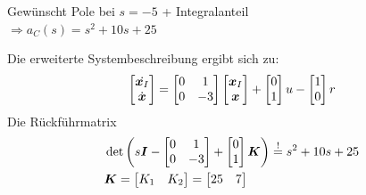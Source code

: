 \begin{tcolorbox}[colback=white!10!white,colframe=green!30!black,title=Integralregelung]
Gewünscht Pole bei $s=-5$ + Integralanteil \\$\Rightarrow a_C(s) = s^2+10s+25$

Die erweiterte Systembeschreibung ergibt sich zu:
\begin{align*}
		\begin{bmatrix}
		\dot{	\boldsymbol{x}_I} \\ \dot{	\boldsymbol{x}}
		\end{bmatrix} = \begin{bmatrix}
			0 & 1\\ 0 & -3
		\end{bmatrix} \begin{bmatrix}
		\boldsymbol{x}_I \\\boldsymbol{x}
		\end{bmatrix} + \begin{bmatrix}
		0 \\1
		\end{bmatrix}u - \begin{bmatrix}
		1\\0
		\end{bmatrix}r
\end{align*}
Die Rückführmatrix 
\begin{align*}
	&\det\left( s\boldsymbol{I} - \begin{bmatrix}
	0 & 1\\ 0 & -3
	\end{bmatrix}+ \begin{bmatrix}
	0 \\1
	\end{bmatrix}\boldsymbol{K}\right) \overset{!}{=} s^2 +10s +25\\
	&\boldsymbol{K} = \begin{bmatrix}
		K_1 & K_2
	\end{bmatrix} = \begin{bmatrix}
	25 & 7
	\end{bmatrix}
\end{align*}
\end{tcolorbox}